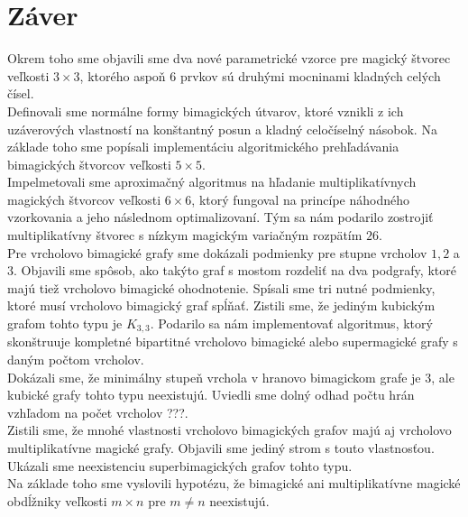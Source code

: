 \chapter*{Záver}  %

Okrem toho sme objavili sme dva nové parametrické vzorce pre magický štvorec veľkosti $3 \times 3$, ktorého aspoň $6$ prvkov sú druhými mocninami kladných celých čísel. \\

Definovali sme normálne formy bimagických útvarov, ktoré vznikli z ich uzáverových vlastností na konštantný posun a kladný celočíselný násobok. Na základe toho sme popísali implementáciu algoritmického prehľadávania bimagických štvorcov veľkosti $5 \times 5$. \\

Impelmetovali sme aproximačný algoritmus na hľadanie multiplikatívnych magických štvorcov veľkosti $6 \times 6$, ktorý fungoval na princípe náhodného vzorkovania a jeho následnom optimalizovaní. Tým sa nám podarilo zostrojiť multiplikatívny štvorec s nízkym magickým variačným rozpätím $26$. \\

Pre vrcholovo bimagické grafy sme dokázali podmienky pre stupne vrcholov $1, 2$ a $3$. Objavili sme spôsob, ako takýto graf s mostom rozdeliť na dva podgrafy, ktoré majú tiež vrcholovo bimagické ohodnotenie. Spísali sme tri nutné podmienky, ktoré musí vrcholovo bimagický graf spĺňať. Zistili sme, že jediným kubickým grafom tohto typu je $K_{3,3}$. Podarilo sa nám implementovať algoritmus, ktorý skonštruuje kompletné bipartitné vrcholovo bimagické alebo supermagické grafy s daným počtom vrcholov. \\

Dokázali sme, že minimálny stupeň vrchola v hranovo bimagickom grafe je $3$, ale kubické grafy tohto typu neexistujú. Uviedli sme dolný odhad počtu hrán vzhľadom na počet vrcholov ???. \\

Zistili sme, že mnohé vlastnosti vrcholovo bimagických grafov majú aj vrcholovo multiplikatívne magické grafy. Objavili sme jediný strom s touto vlastnosťou. Ukázali sme neexistenciu superbimagických grafov tohto typu. \\

Na základe toho sme vyslovili hypotézu, že bimagické ani multiplikatívne magické obdĺžniky veľkosti $m \times n$ pre $m \neq n$ neexistujú. \\
